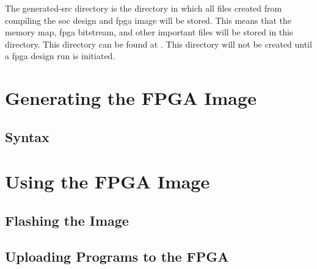 The generated-src directory is the directory in which all files created from compiling the \Gls{soc} design and \Gls{fpga} image will be stored. This means that the memory map, \Gls{fpga} bitstream, and other important files will be stored in this directory. This directory can be found at . This directory will not be created until a \Gls{fpga} design run is initiated.



\section{Generating the FPGA Image}\label{sec:Generating_FPGA_Image}
\subsection{Syntax}\label{sec:Generating_FPGA_Image-Syntax}


\section{Using the FPGA Image}\label{sec:Using_FPGA_Image}
\subsection{Flashing the Image}\label{sec:Flash_FPGA_Image}
\subsection{Uploading Programs to the FPGA}\label{sec:Upload_Programs_to_Flashed_FPGA}
